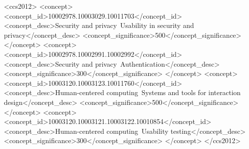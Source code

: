 \documentclass[sigconf]{acmart}
\begin{document}
%
\begin{CCSXML}
<ccs2012>
<concept>
<concept_id>10002978.10003029.10011703</concept_id>
<concept_desc>Security and privacy~Usability in security and privacy</concept_desc>
<concept_significance>500</concept_significance>
</concept>
<concept>
<concept_id>10002978.10002991.10002992</concept_id>
<concept_desc>Security and privacy~Authentication</concept_desc>
<concept_significance>300</concept_significance>
</concept>
<concept>
<concept_id>10003120.10003123.10011760</concept_id>
<concept_desc>Human-centered computing~Systems and tools for interaction design</concept_desc>
<concept_significance>500</concept_significance>
</concept>
<concept>
<concept_id>10003120.10003121.10003122.10010854</concept_id>
<concept_desc>Human-centered computing~Usability testing</concept_desc>
<concept_significance>300</concept_significance>
</concept>
</ccs2012>
\end{CCSXML}




\maketitle

%




\end{document}
